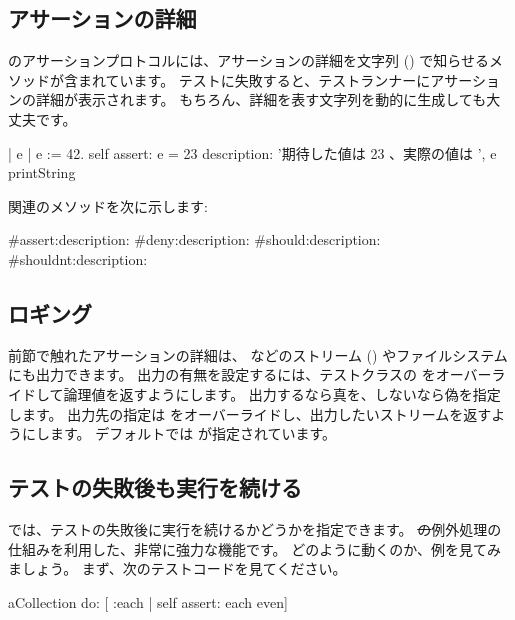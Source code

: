 \documentclass[a4paper,10pt,twoside]{book}
\begin{document}
\subsection{アサーションの詳細}

 のアサーションプロトコルには、アサーションの詳細を文字列 () で知らせるメソッドが含まれています。
テストに失敗すると、テストランナーにアサーションの詳細が表示されます。
もちろん、詳細を表す文字列を動的に生成しても大丈夫です。

\begin{code}{}
| e |
e := 42.
self assert: e = 23
	description: '期待した値は 23 、実際の値は ', e printString
\end{code}

 関連のメソッドを次に示します:
\begin{code}{}
#assert:description:
#deny:description:
#should:description:
#shouldnt:description:
\end{code}

\subsection{ロギング}

前節で触れたアサーションの詳細は、  などのストリーム () やファイルシステムにも出力できます。
出力の有無を設定するには、テストクラスの  をオーバーライドして論理値を返すようにします。
出力するなら真を、しないなら偽を指定します。
出力先の指定は  をオーバーライドし、出力したいストリームを返すようにします。
デフォルトでは  が指定されています。

\subsection{テストの失敗後も実行を続ける}

\sunit では、テストの失敗後に実行を続けるかどうかを指定できます。
\st の例外処理の仕組みを利用した、非常に強力な機能です。
どのように動くのか、例を見てみましょう。
まず、次のテストコードを見てください。

\begin{code}{}
aCollection do: [ :each | self assert: each even]
\end{code}
\end{document}
